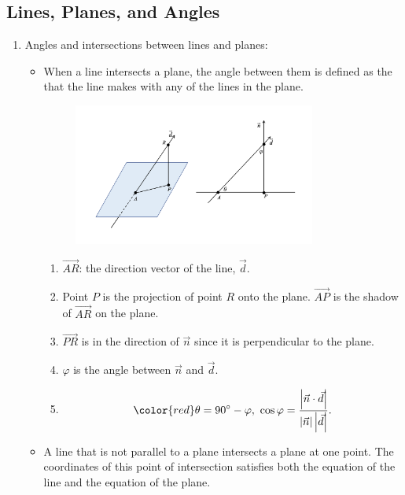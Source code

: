 \documentclass[12pt, a4paper]{article}
\begin{document}
\subsection{Lines, Planes, and Angles}
\begin{enumerate}
  \item Angles and intersections between lines and planes: 
  \begin{itemize}
    \item When a line intersects a plane, the angle between them is defined as the {\color{red}{smallest possible angle}} that the line makes with any of the lines in the plane. 
    \begin{figure}[H]
      \centering
      \includegraphics[width=0.8\textwidth]{Fig.3.14.jpg}
    \end{figure}
    \begin{enumerate}
      \item $\overrightarrow{AR}$: the direction vector of the line, $\vec{d}$.
      \item Point $P$ is the projection of point $R$ onto the plane. $\overrightarrow{AP}$ is the shadow of $\overrightarrow{AR}$ on the plane. 
      \item $\overrightarrow{PR}$ is in the direction of $\vec{n}$ since it is perpendicular to the plane. 
      \item $\varphi$ is the angle between $\vec{n}$ and $\vec{d}$. 
      \item $$\color{red} \theta=90^\circ-\varphi,\ \cos\varphi=\frac{\left|\vec{n}\cdot\vec{d}\right|}{\left|\vec{n}\right|\left|\vec{d}\right|}.$$
    \end{enumerate}
    \item A line that is not parallel to a plane intersects a plane at one point. The coordinates of this point of intersection satisfies both the equation of the line and the equation of the plane. 
  \end{itemize}

\end{enumerate}
\end{document}
